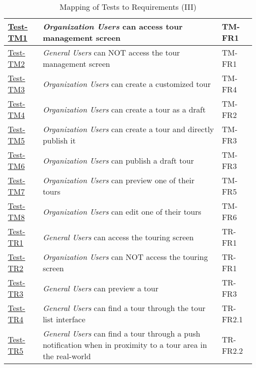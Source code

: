 \documentclass[12pt, titlepage]{article}
\begin{document}
\begin{table}[htpb!]
  \centering
  \begin{tabular}{|l|p{8cm}|p{3cm}|}
    \hline
    \hyperref[itm:Test-TM1]{Test-TM1} & \textit{Organization Users} can access tour management screen                                                         & TM-FR1   \\
    \hline
    \hyperref[itm:Test-TM2]{Test-TM2} & \textit{General Users} can NOT access the tour management screen                                                      & TM-FR1   \\
    \hline
    \hyperref[itm:Test-TM3]{Test-TM3} & \textit{Organization Users} can create a customized tour                                                              & TM-FR4   \\
    \hline
    \hyperref[itm:Test-TM4]{Test-TM4} & \textit{Organization Users} can create a tour as a draft                                                              & TM-FR2   \\
    \hline
    \hyperref[itm:Test-TM5]{Test-TM5} & \textit{Organization Users} can create a tour and directly publish it                                                 & TM-FR3   \\
    \hline
    \hyperref[itm:Test-TM6]{Test-TM6} & \textit{Organization Users} can publish a draft tour                                                                  & TM-FR3   \\
    \hline
    \hyperref[itm:Test-TM7]{Test-TM7} & \textit{Organization Users} can preview one of their tours                                                            & TM-FR5   \\
    \hline
    \hyperref[itm:Test-TM8]{Test-TM8} & \textit{Organization Users} can edit one of their tours                                                               & TM-FR6   \\
    \hline
    \hyperref[itm:Test-TR1]{Test-TR1} & \textit{General Users} can access the touring screen                                                                  & TR-FR1   \\
    \hline
    \hyperref[itm:Test-TR2]{Test-TR2} & \textit{Organization Users} can NOT access the touring screen                                                         & TR-FR1   \\
    \hline
    \hyperref[itm:Test-TR3]{Test-TR3} & \textit{General Users} can preview a tour                                                                             & TR-FR3   \\
    \hline
    \hyperref[itm:Test-TR4]{Test-TR4} & \textit{General Users} can find a tour through the tour list interface                                                & TR-FR2.1 \\
    \hline
    \hyperref[itm:Test-TR5]{Test-TR5} & \textit{General Users} can find a tour through a push notification when in proximity to a tour area in the real-world & TR-FR2.2 \\
    \hline
  \end{tabular}
  \caption{Mapping of Tests to Requirements (III)}
  \label{tab:test_requirements3}
\end{table}
\end{document}

